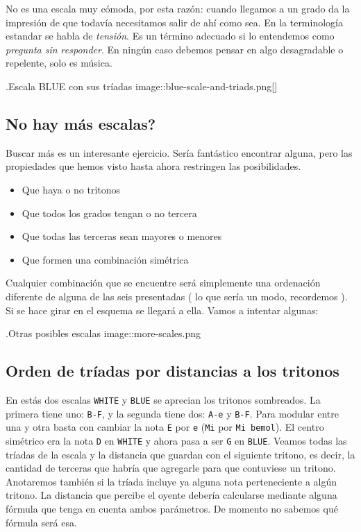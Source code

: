 \documentclass[]{article}
\providecommand{\tightlist}{%
  \setlength{
\itemsep}{0pt}\setlength{\parskip}{0pt}}
\begin{document}
No es una escala muy cómoda, por esta razón: cuando llegamos a un grado da la impresión de que todavía necesitamos salir de ahí como sea. En la terminología estandar se habla de \emph{tensión}. Es un término adecuado si lo entendemos como \emph{pregunta sin responder}. En ningún caso debemos pensar en algo desagradable o repelente, solo es música.

.Escala BLUE con sus tríadas image::blue-scale-and-triads.png{[}{]}

\subsection{No hay más escalas?}

Buscar más es un interesante ejercicio. Sería fantástico encontrar alguna, pero las propiedades que hemos visto hasta ahora restringen las posibilidades.

\begin{itemize}   \tightlist
  \item Que haya o no tritonos
  \item Que todos los grados tengan o no tercera
  \item Que todas las terceras sean mayores o menores
  \item Que formen una combinación simétrica
\end{itemize}

Cualquier combinación que se encuentre será simplemente una ordenación diferente de alguna de las seis presentadas ( lo que sería un modo, recordemos ). Si se hace girar en el esquema se llegará a ella. Vamos a intentar algunas:

.Otras posibles escalas image::more-scales.png

\subsection{Orden de tríadas por distancias a los tritonos}

En estás dos escalas \texttt{WHITE} y \texttt{BLUE} se aprecian los tritonos sombreados. La primera tiene uno: \texttt{B-F}, y la segunda tiene dos: \texttt{A-e} y \texttt{B-F}. Para modular entre una y otra basta con cambiar la nota \texttt{E} por \texttt{e} (\texttt{Mi} por \texttt{Mi\ bemol}). El centro simétrico era la nota \texttt{D} en \texttt{WHITE} y ahora pasa a ser \texttt{G} en \texttt{BLUE}. Veamos todas las tríadas de la escala y la distancia que guardan con el siguiente tritono, es decir, la cantidad de terceras que habría que agregarle para que contuviese un tritono. Anotaremos también si la tríada incluye ya alguna nota perteneciente a algún tritono. La distancia que percibe el oyente debería calcularse mediante alguna fórmula que tenga en cuenta ambos parámetros. De momento no sabemos qué fórmula será esa.
\end{document}
